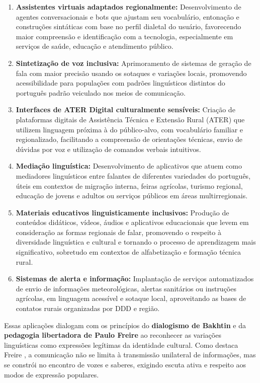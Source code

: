 \begin{enumerate}
    \item \textbf{Assistentes virtuais adaptados regionalmente:} Desenvolvimento de agentes conversacionais e bots que ajustam seu vocabulário, entonação e construções sintáticas com base no perfil dialetal do usuário, favorecendo maior compreensão e identificação com a tecnologia, especialmente em serviços de saúde, educação e atendimento público.

    \item \textbf{Sintetização de voz inclusiva:} Aprimoramento de sistemas de geração de fala com maior precisão usando os sotaques e variações locais, promovendo acessibilidade para populações com padrões linguísticos distintos do português padrão veiculado nos meios de comunicação.

    \item \textbf{Interfaces de ATER Digital culturalmente sensíveis:} Criação de plataformas digitais de Assistência Técnica e Extensão Rural (ATER) que utilizem linguagem próxima à do público-alvo, com vocabulário familiar e regionalizado, facilitando a compreensão de orientações técnicas, envio de dúvidas por voz e utilização de comandos verbais intuitivos.

    \item \textbf{Mediação linguística:} Desenvolvimento de aplicativos que atuem como mediadores linguísticos entre falantes de diferentes variedades do português, úteis em contextos de migração interna, feiras agrícolas, turismo regional, educação de jovens e adultos ou serviços públicos em áreas multirregionais.

    \item \textbf{Materiais educativos linguisticamente inclusivos:} Produção de conteúdos didáticos, vídeos, áudios e aplicativos educacionais que levem em consideração as formas regionais de falar, promovendo o respeito à diversidade linguística e cultural e tornando o processo de aprendizagem mais significativo, sobretudo em contextos de alfabetização e formação técnica rural.

    \item \textbf{Sistemas de alerta e informação:} Implantação de serviços automatizados de envio de informações meteorológicas, alertas sanitários ou instruções agrícolas, em linguagem acessível e sotaque local, aproveitando as bases de contatos rurais organizadas por DDD e região.
\end{enumerate}

Essas aplicações dialogam com os princípios do \textbf{dialogismo de Bakhtin} e da \textbf{pedagogia libertadora de Paulo Freire} ao reconhecer as variações linguísticas como expressões legítimas da identidade cultural. Como destaca Freire \cite{freire2005pedagogia}, a comunicação não se limita à transmissão unilateral de informações, mas se constrói no encontro de vozes e saberes, exigindo escuta ativa e respeito aos modos de expressão populares.


